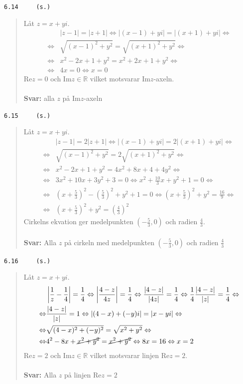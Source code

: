 \documentclass[a4paper]{article}
\newcommand{\tskcol}[1]{\textcolor{tskcol}{#1}}
\begin{document}
	\texttt{\tskcol{6.14~~~~ (s.)}}
	\begin{quotation}
		\noindent
		Låt $z=x+yi$.
		\begin{align*}
		&|z-1|=|z+1| \Leftrightarrow
		|(x-1)+yi|=|(x+1)+yi| \Leftrightarrow \\ \Leftrightarrow
		&\sqrt{(x-1)^2+y^2}=\sqrt{(x+1)^2+y^2} \Leftrightarrow \\ \Leftrightarrow
		&x^2-2x+1+y^2=x^2+2x+1+y^2 \Leftrightarrow \\ \Leftrightarrow
		&4x=0 \Leftrightarrow
		x=0
		\end{align*}
		Re$z=0$ och Im$z\in\mathbb{R}$ vilket motsvarar Im$z$-axeln.
		\\ \\
		\textbf{Svar:} alla $z$ på Im$z$-axeln
	\end{quotation}
	
	\texttt{\tskcol{6.15~~~~ (s.)}}
	\begin{quotation}
		\noindent
		Låt $z=x+yi$.
		\begin{align*}
		&|z-1|=2|z+1| \Leftrightarrow
		|(x-1)+yi|=2|(x+1)+yi| \Leftrightarrow \\ \Leftrightarrow
		&\sqrt{(x-1)^2+y^2}=2\sqrt{(x+1)^2+y^2} \Leftrightarrow \\ \Leftrightarrow
		&x^2-2x+1+y^2=4x^2+8x+4+4y^2 \Leftrightarrow \\ \Leftrightarrow
		&3x^2+10x+3y^2+3=0 \Leftrightarrow
		x^2+\frac{10}{3}x+y^2+1=0 \Leftrightarrow \\ \Leftrightarrow
		&(x+\tfrac{5}{3})^2-(\tfrac{5}{3})^2+y^2+1=0 \Leftrightarrow
		(x+\tfrac{5}{3})^2+y^2=\frac{16}{9} \Leftrightarrow \\ \Leftrightarrow
		&(x+\tfrac{5}{3})^2+y^2=(\tfrac{4}{3})^2
		\end{align*}
		Cirkelns ekvation ger medelpunkten $(-\frac{5}{3},0)$ och radien $\frac{4}{3}$.
		\\ \\
		\textbf{Svar:} Alla $z$ på cirkeln med medelpunkten $(-\frac{5}{3},0)$ och radien $\frac{4}{3}$
	\end{quotation}
	
	\pagebreak
	\texttt{\tskcol{6.16~~~~ (s.)}}
	\begin{quotation}
		\noindent
		Låt $z=x+yi$.
		\begin{align*}
		&\left|\frac{1}{z}-\frac{1}{4}\right|=\frac{1}{4} \Leftrightarrow
		\left|\frac{4-z}{4z}\right|=\frac{1}{4} \Leftrightarrow
		\frac{|4-z|}{|4z|}=\frac{1}{4} \Leftrightarrow
		\frac{1}{4}\frac{|4-z|}{|z|}=\frac{1}{4} \Leftrightarrow \\ \Leftrightarrow
		&\frac{|4-z|}{|z|}=1 \Leftrightarrow
		|(4-x)+(-y)i|=|x-yi| \Leftrightarrow \\ \Leftrightarrow
		&\sqrt{(4-x)^2+(-y)^2}=\sqrt{x^2+y^2} \Leftrightarrow \\ \Leftrightarrow
		&4^2-8x+\cancel{x^2+y^2}=\cancel{x^2+y^2} \Leftrightarrow
		8x=16 \Leftrightarrow
		x=2
		\end{align*}
		Re$z=2$ och Im$z\in\mathbb{R}$ vilket motsvarar linjen Re$z=2$.
		\\ \\
		\textbf{Svar:} Alla $z$ på linjen Re$z=2$
	\end{quotation}
	
\end{document}
